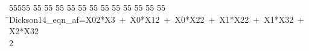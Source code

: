 %
%
\begin{tabbing}
55555 \= 55 \= 55 \= 55 \= 55 \= 55 \= 55 \= 55 \= 55 \= 55 \= 55 \= 55 \= 55 \= \>Dickson14\_eqn\_af=X02*X3\ +\ X0*X12\ +\ X0*X22\ +\ X1*X22\ +\ X1*X32\ +\ X2*X32\\[0pt]
2\>\end{tabbing}
